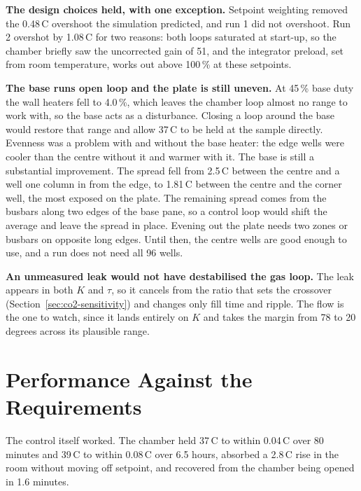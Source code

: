 \textbf{The design choices held, with one exception.} Setpoint weighting removed the 0.48\,\textdegree{}C overshoot the simulation predicted, and run 1 did not overshoot. Run 2 overshot by 1.08\,\textdegree{}C for two reasons: both loops saturated at start-up, so the chamber briefly saw the uncorrected gain of 51, and the integrator preload, set from room temperature, works out above 100\,\% at these setpoints.


\textbf{The base runs open loop and the plate is still uneven.} At 45\,\% base duty the wall heaters fell to 4.0\,\%, which leaves the chamber loop almost no range to work with, so the base acts as a disturbance. Closing a loop around the base would restore that range and allow 37\,\textdegree{}C to be held at the sample directly. Evenness was a problem with and without the base heater: the edge wells were cooler than the centre without it and warmer with it. The base is still a substantial improvement. The spread fell from 2.5\,\textdegree{}C between the centre and a well one column in from the edge, to 1.81\,\textdegree{}C between the centre and the corner well, the most exposed on the plate. The remaining spread comes from the busbars along two edges of the base pane, so a control loop would shift the average and leave the spread in place. Evening out the plate needs two zones or busbars on opposite long edges. Until then, the centre wells are good enough to use, and a run does not need all 96 wells.

\textbf{An unmeasured leak would not have destabilised the gas loop.} The leak appears in both $K$ and $\tau$, so it cancels from the ratio that sets the crossover (Section~\ref{sec:co2-sensitivity}) and changes only fill time and ripple. The flow is the one to watch, since it lands entirely on $K$ and takes the margin from 78 to 20 degrees across its plausible range.

\section{Performance Against the Requirements}
\label{sec:disc-requirements}

The control itself worked. The chamber held 37\,\textdegree{}C to within 0.04\,\textdegree{}C over 80 minutes and 39\,\textdegree{}C to within 0.08\,\textdegree{}C over 6.5 hours, absorbed a 2.8\,\textdegree{}C rise in the room without moving off setpoint, and recovered from the chamber being opened in 1.6 minutes.


